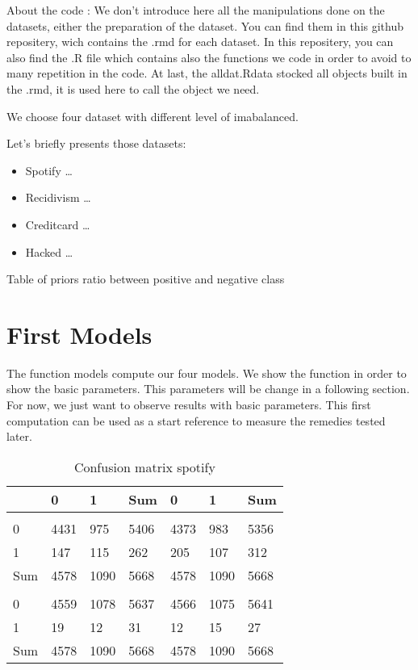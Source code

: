 \documentclass[
]{report}
\providecommand{\tightlist}{%
  \setlength{\itemsep}{0pt}\setlength{\parskip}{0pt}}
\begin{document}
About the code : We don't introduce here all the manipulations done on the datasets, either the preparation of the dataset. You can find them in this github repositery, wich contains the .rmd for each dataset. In this repositery, you can also find the .R file which contains also the functions we code in order to avoid to many repetition in the code. At last, the alldat.Rdata stocked all objects built in the .rmd, it is used here to call the object we need.

We choose four dataset with different level of imabalanced.

Let's briefly presents those datasets:

\begin{itemize}
\tightlist
\item
  Spotify \ldots{}
\item
  Recidivism \ldots{}
\item
  Creditcard \ldots{}
\item
  Hacked \ldots{}
\end{itemize}

Table of priors ratio between positive and negative class

\hypertarget{first-models}{%
\section{First Models}\label{first-models}}

The function models compute our four models. We show the function in order to show the basic parameters. This parameters will be change in a following section. For now, we just want to observe results with basic parameters. This first computation can be used as a start reference to measure the remedies tested later.

\begin{table}

\caption{\label{tab:unnamed-chunk-4}Confusion matrix spotify}
\centering
\begin{tabular}[t]{l|l|l|l|l|l|l}
\hline
  & 0 & 1 & Sum & 0 & 1 & Sum\\
\hline
\cellcolor{lightgrey}{} & \cellcolor{lightgrey}{rf} & \cellcolor{lightgrey}{} & \cellcolor{lightgrey}{} & \cellcolor{lightgrey}{bayes} & \cellcolor{lightgrey}{} & \cellcolor{lightgrey}{}\\
\hline
0 & 4431 & 975 & 5406 & 4373 & 983 & 5356\\
\hline
1 & 147 & 115 & 262 & 205 & 107 & 312\\
\hline
Sum & 4578 & 1090 & 5668 & 4578 & 1090 & \vphantom{1} 5668\\
\hline
\cellcolor{lightgrey}{} & \cellcolor{lightgrey}{lda} & \cellcolor{lightgrey}{} & \cellcolor{lightgrey}{} & \cellcolor{lightgrey}{svm} & \cellcolor{lightgrey}{} & \cellcolor{lightgrey}{}\\
\hline
0 & 4559 & 1078 & 5637 & 4566 & 1075 & 5641\\
\hline
1 & 19 & 12 & 31 & 12 & 15 & 27\\
\hline
Sum & 4578 & 1090 & 5668 & 4578 & 1090 & 5668\\
\hline
\end{tabular}
\end{table}
\end{document}
